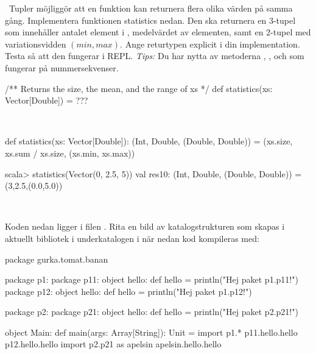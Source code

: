 \QUESTBEGIN

\Task \what~Tupler möjliggör att en funktion kan returnera flera olika värden på samma gång. Implementera funktionen statistics nedan. Den ska returnera en 3-tupel som innehåller antalet element i , medelvärdet av elementen, samt en 2-tupel med variationsvidden $(min, max)$. Ange returtypen explicit i din implementation. Testa så att den fungerar i REPL. \emph{Tips:} Du har nytta av metoderna , ,  och  som fungerar på nummersekvenser.

\begin{Code}
/** Returns the size, the mean, and the range of xs */
def statistics(xs: Vector[Double]) = ???
\end{Code}

\SOLUTION

\TaskSolved \what~

\begin{Code}
def statistics(xs: Vector[Double]): (Int, Double, (Double, Double)) =
  (xs.size, xs.sum / xs.size, (xs.min, xs.max))
\end{Code}

\begin{REPL}
scala> statistics(Vector(0, 2.5, 5))
val res10: (Int, Double, (Double, Double)) = (3,2.5,(0.0,5.0))
\end{REPL}

\QUESTEND





\QUESTBEGIN

\Task \what~

\Subtask Koden nedan ligger i filen . Rita en bild av katalogstrukturen som skapas i aktuellt bibliotek i underkatalogen  i  när nedan kod kompileras med: 
\begin{Code}
package gurka.tomat.banan

package p1:
  package p11:
    object hello:
      def hello = println("Hej paket p1.p11!")
  package p12:
    object hello:
      def hello = println("Hej paket p1.p12!")

package p2:
  package p21:
    object hello:
      def hello = println("Hej paket p2.p21!")

object Main:
  def main(args: Array[String]): Unit =
    import p1.*
    p11.hello.hello
    p12.hello.hello
    import p2.{p21 as apelsin}
    apelsin.hello.hello
\end{Code}

